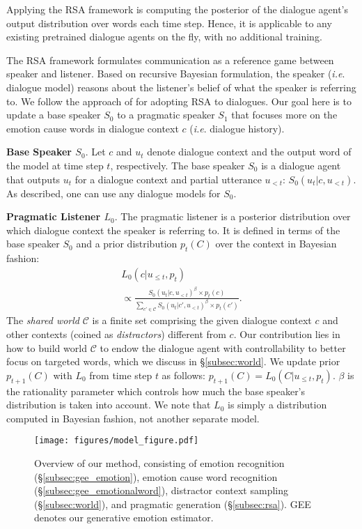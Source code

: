 \documentclass[11pt]{article}
\makeatletter
\DeclareRobustCommand\onedot{\futurelet\@let@token\@onedot}
\def\onedot{. }
\def\ie{\emph{i.e}\onedot} \def\Ie{\emph{I.e}\onedot}
\makeatother
\begin{document}
Applying the RSA framework is computing the posterior of the dialogue agent's output distribution over words each time step. Hence, it is applicable to any existing pretrained dialogue agents on the fly, with no additional training.

The RSA framework formulates communication as a reference game between speaker and listener.
Based on recursive Bayesian formulation, the speaker (\ie dialogue model) reasons about the listener's belief of what the speaker is referring to.
We follow the approach of \citet{Kim:2020:EMNLP} for adopting RSA to dialogues.
Our goal here is to update a base speaker $S_0$ to a pragmatic speaker $S_1$ that focuses more on the emotion cause words in dialogue context $c$ (\ie dialogue history).

\textbf{Base Speaker $S_0$}.
Let $c$ and $u_t$ denote dialogue context and the output word of the model at time step $t$, respectively.
The base speaker $S_0$ is a dialogue agent that outputs $u_t$ for a dialogue context and partial utterance $u_{<t}$: $S_0(u_t|c, u_{<t})$.
As described, one can use any dialogue models for $S_0$.

\textbf{Pragmatic Listener $L_0$}.
The pragmatic listener is a posterior distribution over which dialogue context the speaker is referring to.
It is defined in terms of the base speaker $S_0$ and a prior distribution $p_t(C)$ over the context in Bayesian fashion:
\begin{multline} \label{eq:listener}
    L_0(c|u_{\leq t}, p_t) \\
    \propto \frac{S_0(u_t|c, u_{<t})^\beta \times p_t(c)}{\sum_{c' \in \mathcal{C}} S_0(u_t|c', u_{<t})^\beta \times p_t(c')}.
\end{multline}
The \textit{shared world} $\mathcal{C}$ is a finite set comprising the given dialogue context $c$ and other contexts (coined as \textit{distractors}) different from $c$.
Our contribution lies in how to build world $\mathcal{C}$ to endow the dialogue agent with controllability to better focus on targeted words, which we discuss in \S \ref{subsec:world}.
We update prior $p_{t+1}(C)$ with $L_0$ from time step $t$ as follows: $p_{t+1}(C) = L_0(C|u_{\leq t}, p_t)$.
$\beta$ is the rationality parameter which controls how much the base speaker's distribution is taken into account.
We note that $L_0$ is simply a distribution computed in Bayesian fashion, not another separate model.



\begin{figure}[t] \begin{center}
    \vspace{-5pt}
\texttt{[image: figures/model\_figure.pdf]}
    \caption{Overview of our method, consisting of emotion recognition (\S \ref{subsec:gee_emotion}),
        emotion cause word recognition (\S \ref{subsec:gee_emotionalword}),
        distractor context sampling (\S \ref{subsec:world}), and pragmatic generation (\S \ref{subsec:rsa}).
        GEE denotes our generative emotion estimator.}
    \label{fig:model}
    \vspace{-10pt}
\end{center} \end{figure}
\end{document}
